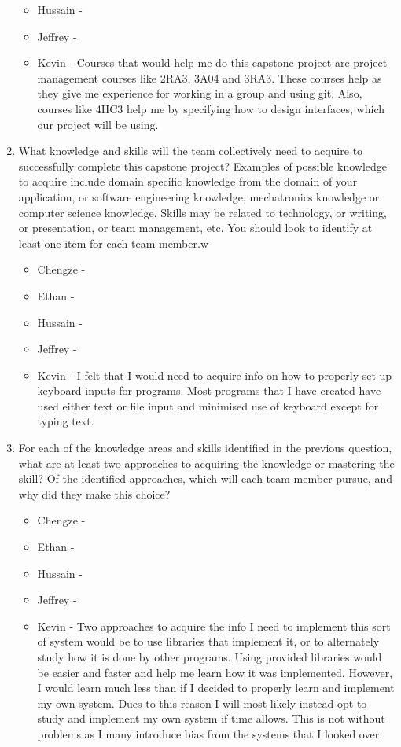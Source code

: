 \begin{enumerate}
\begin{itemize}
        \item Hussain - 
        \item Jeffrey - 
        \item Kevin - Courses that would help me do this capstone project are project management courses like 2RA3, 3A04 and 3RA3. These courses help as they give me experience for working in a group and using git. Also, courses like 4HC3 help me by specifying how to design interfaces, which our project will be using.  
  \end{itemize} 
  \item What knowledge and skills will the team collectively need to acquire to
  successfully complete this capstone project?  Examples of possible knowledge
  to acquire include domain specific knowledge from the domain of your
  application, or software engineering knowledge, mechatronics knowledge or
  computer science knowledge.  Skills may be related to technology, or writing,
  or presentation, or team management, etc.  You should look to identify at
  least one item for each team member.w
  \begin{itemize}
        \item Chengze - 
        \item Ethan - 
        \item Hussain - 
        \item Jeffrey - 
        \item Kevin - I felt that I would need to acquire info on how to properly set up keyboard inputs for programs. Most programs that I have created have used either text or file input and minimised use of keyboard except for typing text. 
  \end{itemize} 
  \item For each of the knowledge areas and skills identified in the previous
  question, what are at least two approaches to acquiring the knowledge or
  mastering the skill?  Of the identified approaches, which will each team
  member pursue, and why did they make this choice?
  \begin{itemize}
        \item Chengze - 
        \item Ethan - 
        \item Hussain - 
        \item Jeffrey - 
        \item Kevin - Two approaches to acquire the info I need to implement this sort of system would be to use libraries that implement it, or to alternately study how it is done by other programs. Using provided libraries would be easier and faster and help me learn how it was implemented. However, I would learn much less than if I decided to properly learn and implement my own system. Dues to this reason I will most likely instead opt to study and implement my own system  if time allows. This is not without problems as I many introduce bias from the systems that I looked over.
  \end{itemize} 
\end{enumerate}
